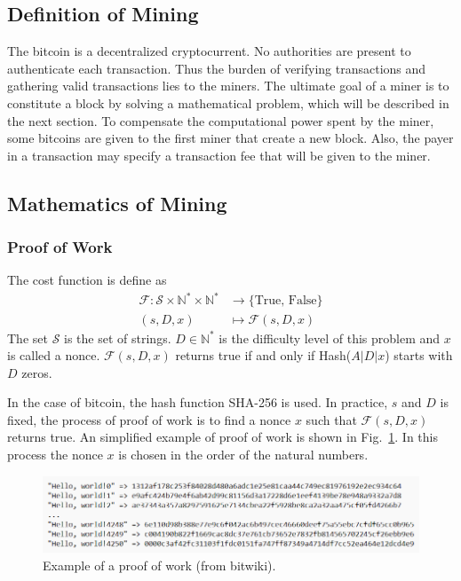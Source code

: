 \documentclass[12pt,a4paper]{article}
\begin{document}
\subsection{Definition of Mining}
The bitcoin is a decentralized cryptocurrent. No authorities are present to authenticate each transaction. Thus the burden of verifying transactions and gathering valid transactions lies to the miners. The ultimate goal of a miner is to constitute a block by solving a mathematical problem, which will be described in the next section. To compensate the computational power spent by the miner, some bitcoins are given to the first miner that create a new block. Also, the payer in a transaction may specify a transaction fee that will be given to the miner. 
\subsection{Mathematics of Mining}
\subsubsection{Proof of Work}
The cost function is define as 
\begin{align*}
\mathcal{F}: \mathcal{S}\times \mathbb{N}^* \times \mathbb{N}^* &\longrightarrow \{\text{True, False}\}\\
(s, D, x)&\longmapsto \mathcal{F}(s, D, x)
\end{align*}
The set $\mathcal{S}$ is the set of strings. $D \in \mathbb{N}^*$ is the difficulty level of this problem and $x$ is called a nonce. $\mathcal{F}(s, D, x)$ returns true if and only if Hash($A|D|x$) starts with $D$ zeros. 


In the case of bitcoin, the hash function SHA-256 is used. In practice, $s$ and $D$ is fixed, the process of proof of work is to find a nonce $x$ such that $\mathcal{F}(s, D, x)$ returns true. An  simplified example of proof of work is shown in Fig.~\ref{fig:hash}. In this process the nonce $x$ is chosen in the order of the natural numbers.

\begin{figure}[tbph!]
	\centering
	\includegraphics[width=0.9\linewidth]{Hash}
	\caption{Example of a proof of work (from bitwiki).}
	\label{fig:hash}
\end{figure}
\end{document}
